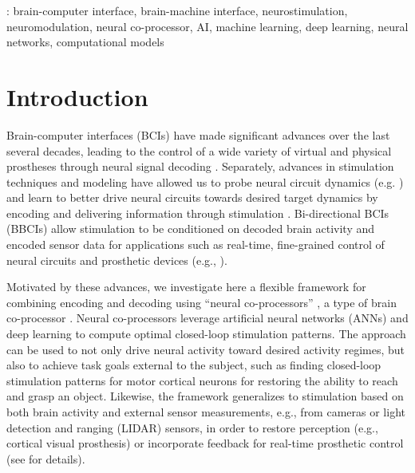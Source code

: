 \documentclass[12pt]{iopart}
\begin{document}
\vspace{2pc}
: brain-computer interface, brain-machine interface, neurostimulation,
neuromodulation, neural co-processor, AI, machine learning, deep learning, neural networks,
computational models
%
%
\maketitle
% 
%



\section{Introduction}
Brain-computer interfaces (BCIs) have made significant advances over the last several decades, leading
to the control of a wide variety of virtual and physical prostheses through neural signal decoding
\cite{rao.bcibook, wolpaw.bcibook, moritz.neuro, lebedev.bmi}. Separately, advances in stimulation
techniques and modeling have allowed us to probe neural circuit dynamics (e.g. \cite{walker.inception})
and learn to better drive neural circuits towards desired target dynamics by encoding and delivering
information through stimulation \cite{niparko.cochlear, weiland.retinal, tomlinson.propr, tabot.tact,
tyler.tact, dadarlat.tact, sharlene.tact, cronin.tact}. Bi-directional BCIs (BBCIs) allow stimulation
to be conditioned on decoded brain activity and encoded sensor data for applications such as real-time,
fine-grained control of neural circuits and prosthetic devices (e.g., \cite{nicolelis.bmbi}).

Motivated by these advances, we investigate here a flexible framework for combining encoding
and decoding using ``neural co-processors'' \cite{rao.coproc}, a type of brain co-processor \cite{rao.braincoproc}.
Neural co-processors leverage artificial neural networks (ANNs) and deep
learning to compute optimal closed-loop stimulation patterns. The approach can be used to not only drive neural activity
toward desired activity regimes, but also to achieve task goals external to the subject, such as finding closed-loop
stimulation patterns for motor cortical neurons for restoring the ability to reach and grasp an object. Likewise, the
framework generalizes to stimulation based on both brain activity and external sensor measurements, e.g., from cameras or
light detection and ranging (LIDAR) sensors, in order to restore perception (e.g., cortical visual prosthesis) or
incorporate feedback for real-time prosthetic control (see \cite{rao.braincoproc} for details).
\end{document}
